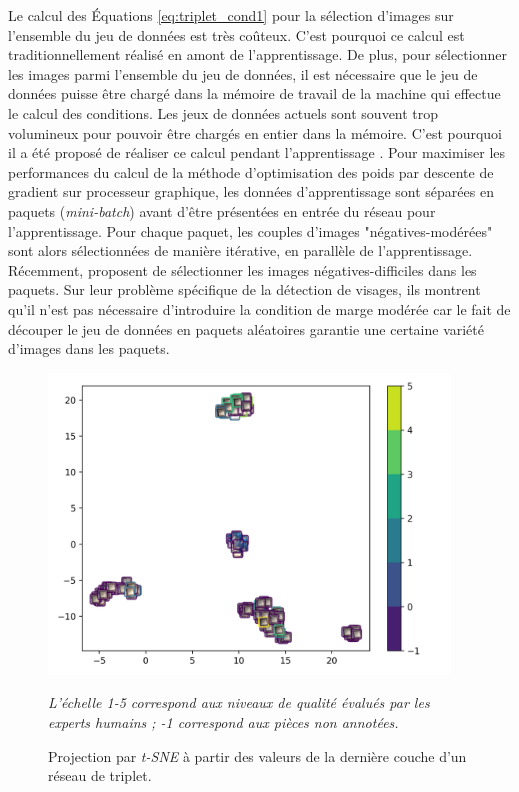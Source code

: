 Le calcul des Équations \ref{eq:triplet_cond1} pour la sélection d'images sur l'ensemble du jeu de données est très coûteux.
C'est pourquoi ce calcul est traditionnellement réalisé en amont de l'apprentissage. De plus, pour sélectionner les images parmi l'ensemble du jeu de données, il est nécessaire que le jeu de données puisse être chargé dans la mémoire de travail de la machine qui effectue le calcul des conditions.
Les jeux de données actuels sont souvent trop volumineux pour pouvoir être chargés en entier dans la mémoire.
C'est pourquoi il a été proposé de réaliser ce calcul pendant l'apprentissage \cite{wang_learning_2014,schroff_facenet_2015}.
Pour maximiser les performances du calcul de la méthode d'optimisation des poids par descente de gradient sur processeur graphique, les données d'apprentissage sont séparées en paquets (\textit{mini-batch}) avant d'être présentées en entrée du réseau pour l'apprentissage.
Pour chaque paquet, les couples d'images "négatives-modérées" sont alors sélectionnées de manière itérative, en parallèle de l'apprentissage.
Récemment, \citeauthor{hermans_defense_2017} \cite{hermans_defense_2017, yu_correcting_2018} proposent de sélectionner les images négatives-difficiles dans les paquets.
Sur leur problème spécifique de la détection de visages, ils montrent qu'il n'est pas nécessaire d'introduire la condition de marge modérée car le fait de découper le jeu de données en paquets aléatoires garantie une certaine variété d'images dans les paquets.

\begin{figure}[hbtp]
	\centering
	\includegraphics[width=0.95\textwidth,height=\textheight,keepaspectratio]{../Chap4/Figures/visualize_UMAP_pixel_space_10_0_5corr.png}
	\caption{Projection par \textit{t-SNE} à partir des valeurs de la dernière couche d'un réseau de triplet.}
	\textit{L'échelle 1-5 correspond aux niveaux de qualité évalués par les experts humains ; -1 correspond aux pièces non annotées.}
	\label{fig:triplet_result}
\end{figure}

